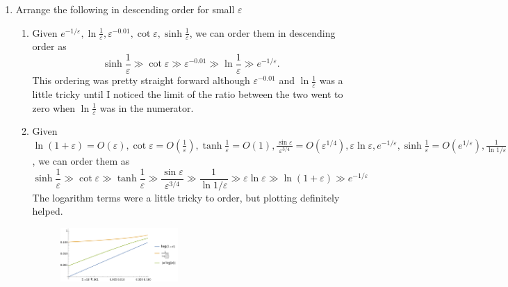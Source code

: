 \documentclass[a4paper,12pt]{article}
\newcommand{\eps}{\varepsilon}
\begin{document}
\begin{enumerate}[label = \arabic*)]
	\item Arrange the following in descending order for small $ \eps $
	\begin{enumerate}[label = (\alph*)]
		\item Given $ e^{-1/\eps}, \ln \frac{1}{\eps}, \eps^{-0.01}, \cot \eps, \sinh \frac{1}{\eps} $, we can order them in descending order as
		\[
			\sinh \frac{1}{\eps} \gg \cot \eps \gg \eps^{-0.01} \gg \ln \frac{1}{\eps} \gg e^{-1/\eps}.
		\]
		This ordering was pretty straight forward although $ \eps^{-0.01} $ and $ \ln \frac{1}{\eps} $ was a little tricky until I noticed the limit of the ratio between the two went to zero when $ \ln \frac{1}{\eps} $ was in the numerator.
		
		\item Given $ \ln(1 + \eps) = O(\eps), \cot \eps = O\left(\frac{1}{\eps}\right), \tanh \frac{1}{\eps} = O(1), \frac{\sin \eps}{\eps^{3/4}} = O(\eps^{1/4}), \eps \ln \eps, e^{-1/\eps}, \sinh \frac{1}{\eps} = O(e^{1/\eps}), \frac{1}{\ln 1/\eps} $, we can order them as
		\[
			\sinh \frac{1}{\eps} \gg \cot \eps \gg \tanh \frac{1}{\eps} \gg \frac{\sin \eps}{\eps^{3/4}} \gg \frac{1}{\ln 1 / \eps} \gg \eps \ln \eps \gg \ln(1 + \eps) \gg e^{-1/\eps}
		\]
		The logarithm terms were a little tricky to order, but plotting definitely helped.
		\begin{figure}[h!]
			\centering
			\includegraphics[width = 0.45\textwidth]{Images/6b.png}
		\end{figure}
		

\end{enumerate}
\end{enumerate}
\end{document}
